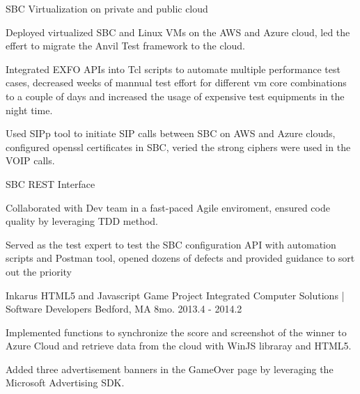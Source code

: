 \begin{cventries}
\cventry
{SBC Virtualization on private and public cloud} %
{} %
{} %
{} %
{ %
\begin{cvitems}
\item {Deployed virtualized SBC and Linux VMs on the AWS and Azure cloud, led the effert to migrate the Anvil Test framework to the cloud.}
\item {Integrated EXFO APIs into Tcl scripts to automate multiple performance test cases, decreased weeks of mannual test effort for different vm core combinations to a couple of days and increased the usage of expensive test equipments in the night time.}
\item {Used SIPp tool to initiate SIP calls between SBC on AWS and Azure clouds, configured openssl certificates in SBC, veried the strong ciphers were used in the VOIP calls.}
\end{cvitems}
}


\cventry
{SBC REST Interface} %
{} %
{} %
{} %
{ %
\begin{cvitems}
\item {Collaborated with Dev team in a fast-paced Agile enviroment, ensured code quality by leveraging TDD method.}
\item {Served as the test expert to test the SBC configuration API with automation scripts and Postman tool, opened dozens of defects and provided guidance to sort out the priority}
\end{cvitems}
}


\cventry
{Inkarus HTML5 and Javascript Game Project} %
{Integrated Computer Solutions | Software Developers} %
{Bedford, MA} %
{8mo. 2013.4 - 2014.2} %
{ %
\begin{cvitems}
\item {Implemented functions to synchronize the score and screenshot of the winner to Azure Cloud and retrieve data from the cloud with WinJS libraray and HTML5.}
\item {Added three advertisement banners in the GameOver page by leveraging the Microsoft Advertising SDK}.
\end{cvitems} 
}


\end{cventries}
